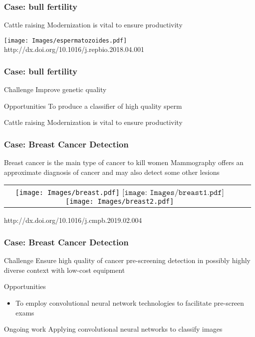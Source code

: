 \documentclass{beamer}
\begin{document}
\begin{frame}\frametitle{Case: bull fertility}
 \begin{alertblock}{Cattle raising}
Modernization is vital to ensure productivity
 \end{alertblock}
 \centering
 \texttt{[image: Images/espermatozoides.pdf]}
 http://dx.doi.org/10.1016/j.repbio.2018.04.001
\end{frame}

\begin{frame}\frametitle{Case: bull fertility}
 \begin{block}{Challenge}
Improve genetic quality
 \end{block}

\begin{exampleblock}{Opportunities}
     To produce a classifier of high quality sperm
\end{exampleblock}
 \begin{alertblock}{Cattle raising}
Modernization is vital to ensure productivity
 \end{alertblock}
\end{frame}


\begin{frame}\frametitle{Case: Breast Cancer Detection}
  \begin{alertblock}{Breast cancer is the main type of cancer to kill women}
    Mammography offers an approximate diagnosis of cancer and may also detect some other lesions
  \end{alertblock}
\centering
  \begin{tabular}{ccc}
  \texttt{[image: Images/breast.pdf]} $  \texttt{[image: Images/breast1.pdf]} $ \texttt{[image: Images/breast2.pdf]}\\
  \end{tabular}
  http://dx.doi.org/10.1016/j.cmpb.2019.02.004
\end{frame}

\begin{frame}\frametitle{Case: Breast Cancer Detection}
  \begin{block}{Challenge}
Ensure high quality of cancer pre-screening detection in possibly highly diverse context with low-cost equipment 
  \end{block}

	\begin{exampleblock}{Opportunities}
    \begin{itemize}
      \item To employ convolutional neural network technologies to facilitate pre-screen exams 
    \end{itemize}
	\end{exampleblock}

  \begin{alertblock}{Ongoing work}
Applying convolutional neural networks to classify images
  \end{alertblock}

\end{frame}
\end{document}
